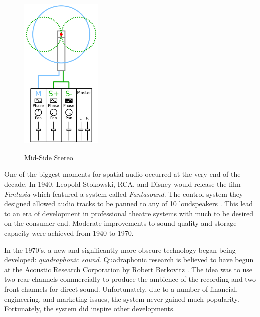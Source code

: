 \begin{figure}[h!]%
\centering
\includegraphics[width=0.35\textwidth]{img/ms_stereo.svg.png} 
\label{fig:ms_stereo}
\caption{Mid-Side Stereo \cite{ms_stereo_pic}}
\end{figure}

One of the biggest moments for spatial audio occurred at the very end of the decade. In 1940, Leopold Stokowski, RCA, and Disney would release the film \textit{Fantasia} which featured a system called \textit{Fantasound}. The control system they designed allowed audio tracks to be panned to any of 10 loudspeakers \cite{klapholz1991fantasia}. This lead to an era of development in professional theatre systems with much to be desired on the consumer end. Moderate improvements to sound quality and storage capacity were achieved from 1940 to 1970.

In the 1970's, a new and significantly more obscure technology began being developed: \textit{quadraphonic sound}. Quadraphonic research is believed to have begun at the Acoustic Research Corporation by Robert Berkovitz \cite{davis2003history}. The idea was to use two rear channels commercially to produce the ambience of the recording and two front channels for direct sound. Unfortunately, due to a number of financial, engineering, and marketing issues, the system never gained much popularity. Fortunately, the system did inspire other developments. 

